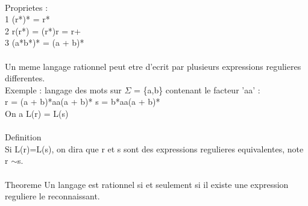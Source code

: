 \documentclass[5pt]{article}
\begin{document}
\begin{scriptsize}
\\
Proprietes :\\
1 (r*)* = r*\\
2 r(r*) = (r*)r = r+\\
3 (a*b*)* = (a + b)*\\
\\
Un meme langage rationnel peut etre d'ecrit par plusieurs expressions regulieres differentes.\\
Exemple : langage des mots sur $\Sigma$ = \{a,b\} contenant le facteur ’aa’ :\\
r = (a + b)*aa(a + b)* s = b*aa(a + b)*\\
On a L(r) = L(s)\\
\\
Definition\\
Si L(r)=L(s), on dira que r et s sont des expressions regulieres equivalentes, note r $\sim$s.\\
\\
Theoreme Un langage est rationnel si et seulement si il existe une expression reguliere le reconnaissant.

\end{scriptsize}
\end{document}
